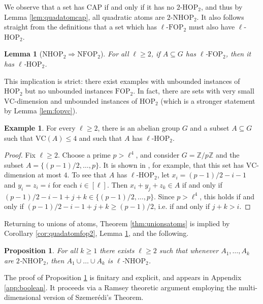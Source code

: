 \documentclass[12pt,oneside,british,a4wide]{amsart}
\newtheorem{lemma}[theorem]{Lemma}
\newtheorem{proposition}[theorem]{Proposition}
\numberwithin{equation}{section}
\theoremstyle{definition}
\newtheorem{example}[theorem]{Example}
\def\FOP{\mathrm{FOP}}
\def\NFOP{\mathrm{NFOP}}
\def\HOP{\mathrm{HOP}}
\def\NHOP{\mathrm{NHOP}}
\def\VC{\mathrm{VC}}
\begin{document}
We observe that a set has CAP if and only if it has no $2$-$\HOP_2$, and thus by Lemma \ref{lem:quadatomcap}, all quadratic atoms are $2$-$\NHOP_2$.  It also follows straight from the definitions that a set which has $\ell$-$\FOP_2$ must also have $\ell$-$\HOP_2$.

\begin{lemma}[$\NHOP_2\Rightarrow \NFOP_2$]\label{lem:fophop}
For all $\ell\geq 2$, if $A\subseteq G$ has $\ell$-$\FOP_2$, then it has $\ell$-$\HOP_2$.
\end{lemma}

This implication is strict: there exist examples with unbounded instances of $\HOP_2$ but no unbounded instances $\FOP_2$.  In fact, there are sets with very small $\VC$-dimension and unbounded instances of $\HOP_2$ (which is a stronger statement by Lemma \ref{lem:fopvc}).

\begin{example}\label{exa:vchop}
For every $\ell\geq 2$, there is an abelian group $G$ and a subset $A\subseteq G$ such that $\VC(A)\leq 4$ and such that $A$ has $\ell$-$\HOP_2$. 
\end{example}
\begin{proof}
Fix $\ell\geq 2$.  Choose a prime $p>\ell^4$, and consider $G=\mathbb{Z}/p\mathbb{Z}$ and the subset $A=\{(p-1)/2,\ldots, p\}$.  It is shown in \cite{Alon.2018is}, for example, that this set has $\VC$-dimension at most $4$.  To see that $A$ has $\ell$-$\HOP_2$, let $x_i=(p-1)/2-i-1$ and $y_i=z_i=i$ for each $i\in [\ell]$.  Then $x_i+y_j+z_k\in A$ if and only if $(p-1)/2-i-1+j+k\in \{(p-1)/2,\ldots, p\}$.  Since $p>\ell^4$, this holds if and only if $(p-1)/2-i-1+j+k\geq  (p-1)/2$, i.e. if and only if $j+k>i$.
\end{proof}

Returning to unions of atoms, Theorem \ref{thm:unionsatoms} is implied by Corollary \ref{cor:quadatomfop2}, Lemma \ref{lem:fophop}, and the following.

\begin{proposition}\label{prop:twotameunion}
For all $k\geq 1$ there exists $\ell\geq 2$ such that whenever $A_1,\ldots, A_k$ are $2$-$\NHOP_2$, then $A_1\cup \ldots \cup A_k$ is $\ell$-$\NHOP_2$. 
\end{proposition}

The proof of Proposition \ref{prop:twotameunion} is finitary and explicit, and appears in Appendix \ref{app:boolean}.  It proceeds via a Ramsey theoretic argument employing the multi-dimensional version of Szemer\'{e}di's Theorem.
\end{document}
